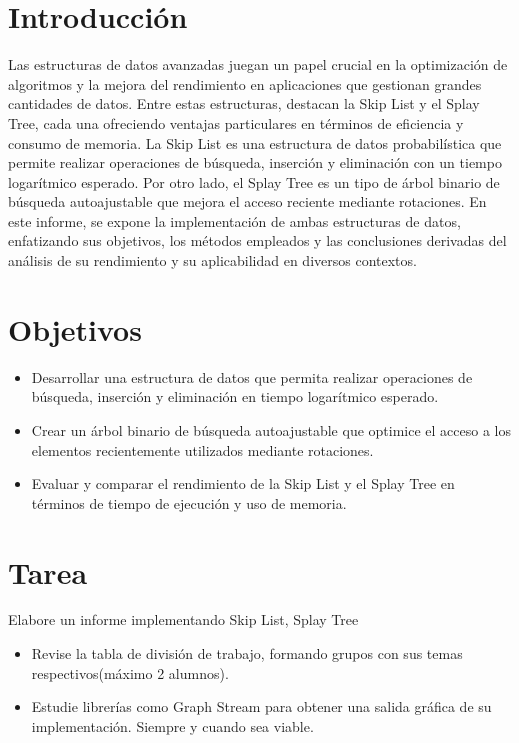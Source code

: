 \documentclass{article}
\begin{document}
  \section{Introducción}
  Las estructuras de datos avanzadas juegan un papel crucial en la optimización de algoritmos y la mejora del rendimiento 
  en aplicaciones que gestionan grandes cantidades de datos. Entre estas estructuras, destacan la Skip List y el Splay Tree, 
  cada una ofreciendo ventajas particulares en términos de eficiencia y consumo de memoria. La Skip List es una estructura de 
  datos probabilística que permite realizar operaciones de búsqueda, inserción y eliminación con un tiempo logarítmico esperado. 
  Por otro lado, el Splay Tree es un tipo de árbol binario de búsqueda autoajustable que mejora el acceso reciente mediante rotaciones.
  \newline
  En este informe, se expone la implementación de ambas estructuras de datos, enfatizando sus objetivos, los métodos empleados 
  y las conclusiones derivadas del análisis de su rendimiento y su aplicabilidad en diversos contextos.


  \section{Objetivos}
  \begin{itemize}
    \item Desarrollar una estructura de datos que permita realizar operaciones de búsqueda, inserción y eliminación en tiempo logarítmico esperado.
    \item Crear un árbol binario de búsqueda autoajustable que optimice el acceso a los elementos recientemente utilizados mediante rotaciones.
    \item Evaluar y comparar el rendimiento de la Skip List y el Splay Tree en términos de tiempo de ejecución y uso de memoria.
  \end{itemize}
  
 
	\section{Tarea}
  Elabore un informe implementando Skip List, Splay Tree
  \begin{itemize}
    \item Revise la tabla de división de trabajo, formando grupos con sus temas respectivos(máximo 2 alumnos).
    \item Estudie librerías como Graph Stream para obtener una salida gráfica de su implementación. Siempre y cuando sea viable.
  \end{itemize}
 
\end{document}
